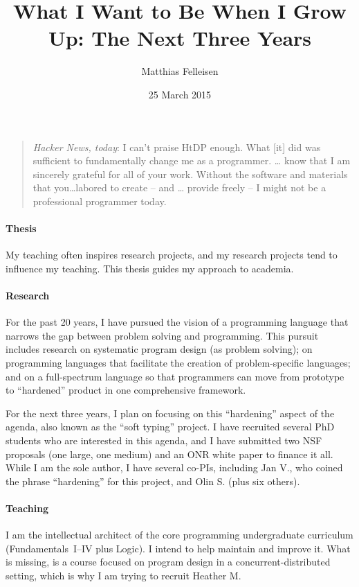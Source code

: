 \documentclass{article}
\title{\large What I Want to Be When I Grow Up: The Next Three Years}
\author{Matthias Felleisen}
\date{\small 25 March 2015}
\begin{document}
\maketitle 
\thispagestyle{empty}

\begin{quote}
\footnotesize {\it Hacker News, today\/}: I can't praise HtDP enough. What
 [it] did was sufficient to fundamentally change me as a programmer. \ldots
 know that I am sincerely grateful for all of your work. Without the
 software and materials that you\ldots labored to create -- and \ldots
 provide freely -- I might not be a professional programmer today.
\end{quote}

\paragraph{Thesis} My teaching often inspires research projects, and my
 research projects tend to influence my teaching. This thesis guides my
 approach to academia. 

\paragraph{Research} For the past 20 years, I have pursued the vision of a
 programming language that narrows the gap between problem solving and
 programming.  This pursuit includes
 research on systematic program design (as problem solving); on programming
 languages that facilitate the creation of problem-specific languages; and
 on a full-spectrum language so that programmers can move from prototype to
 ``hardened'' product in one comprehensive framework.

For the next three years, I plan on focusing on this ``hardening'' aspect
 of the agenda, also known as the ``soft typing'' project. I have recruited
 several PhD students who are interested in this agenda, and I have
 submitted two NSF proposals (one large, one medium) and an ONR white paper
 to finance it all.  While I am the sole author, I have several co-PIs,
 including Jan V., who coined the phrase ``hardening'' for this project,
 and Olin S. (plus six others).

\paragraph{Teaching} I am the intellectual architect of the core
 programming undergraduate curriculum (Fundamentals~I--IV plus Logic). I
 intend to help maintain and improve it. What is missing, is a course
 focused on program design in a concurrent-distributed setting, which is
 why I am trying to recruit Heather M.
\end{document}
